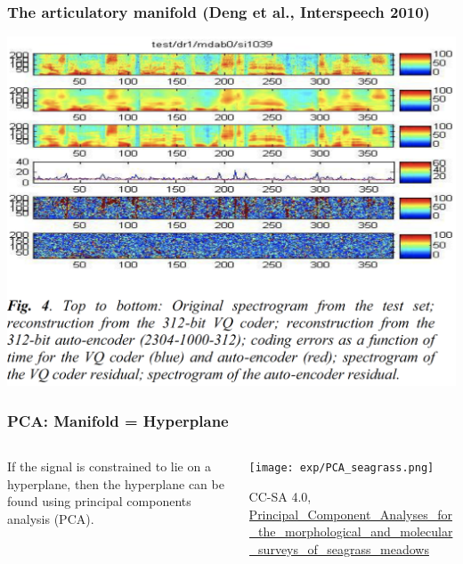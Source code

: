 \documentclass{beamer}
\begin{document}
\begin{frame}
  \frametitle{The articulatory manifold (Deng et al., Interspeech 2010)}

  \centerline{\includegraphics[height=0.88\textheight]{figs/deng2010fig4.png}}
\end{frame}

\begin{frame}
  \frametitle{PCA: Manifold = Hyperplane}
  \begin{columns}
    \begin{column}{0.5\textwidth}
      If the signal is constrained to lie on a hyperplane, then the
      hyperplane can be found using principal components analysis
      (PCA).
    \end{column}
    \begin{column}{0.5\textwidth}
      \begin{center}
        \texttt{[image: exp/PCA\_seagrass.png]}

        \begin{tiny}
          CC-SA 4.0, \url{Principal_Component_Analyses_for_the_morphological_and_molecular_surveys_of_seagrass_meadows}
        \end{tiny}
      \end{center}
    \end{column}
  \end{columns}
\end{frame}
  
\end{document}
